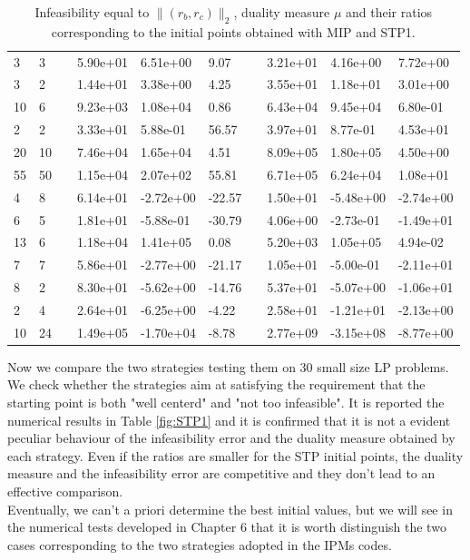 \documentclass[a4paper,10 pt,titlepage,twoside]{book}
\theoremstyle{plain}
\theoremstyle{definition}
\theoremstyle{remark}
\begin{document}
{{\begin{table}[!h]
\begin{tabular}{llllllllll}
		3 & 3 &  & 5.90e+01 & 6.51e+00 & 9.07 &  & 3.21e+01 & 4.16e+00 & 7.72e+00 \\
		3 & 2 &  & 1.44e+01 & 3.38e+00 & 4.25 &  & 3.55e+01 & 1.18e+01 & 3.01e+00 \\
		10 & 6 &  & 9.23e+03 & 1.08e+04 & 0.86 &  & 6.43e+04 & 9.45e+04 & 6.80e-01 \\
		2 & 2 &  & 3.33e+01 & 5.88e-01 & 56.57 &  & 3.97e+01 & 8.77e-01 & 4.53e+01 \\
		20 & 10 &  & 7.46e+04 & 1.65e+04 & 4.51 &  & 8.09e+05 & 1.80e+05 & 4.50e+00 \\
		55 & 50 &  & 1.15e+04 & 2.07e+02 & 55.81 &  & 6.71e+05 & 6.24e+04 & 1.08e+01 \\
		4 & 8 &  & 6.14e+01 & -2.72e+00 & -22.57 &  & 1.50e+01 & -5.48e+00 & -2.74e+00 \\
		6 & 5 &  & 1.81e+01 & -5.88e-01 & -30.79 &  & 4.06e+00 & -2.73e-01 & -1.49e+01 \\
		13 & 6 &  & 1.18e+04 & 1.41e+05 & 0.08 &  & 5.20e+03 & 1.05e+05 & 4.94e-02 \\
		7 & 7 &  & 5.86e+01 & -2.77e+00 & -21.17 &  & 1.05e+01 & -5.00e-01 & -2.11e+01 \\
		8 & 2 &  & 8.30e+01 & -5.62e+00 & -14.76 &  & 5.37e+01 & -5.07e+00 & -1.06e+01 \\
		2 & 4 &  & 2.64e+01 & -6.25e+00 & -4.22 &  & 2.58e+01 & -1.21e+01 & -2.13e+00 \\
		10 & 24 &  & 1.49e+05 & -1.70e+04 & -8.78 &  & 2.77e+09 & -3.15e+08 & -8.77e+00 \\ \hline
	\end{tabular}\caption{Infeasibility equal to $\lVert (r_{b}, r_{c})\rVert_{2}$, duality measure ${\mu}$ and their ratios corresponding to the initial points obtained with MIP and STP1.}
\end{table}
Now we compare the two strategies testing them on 30 small size LP problems.\\ 
We check whether the strategies aim at satisfying the requirement that the starting point is both "well centerd" and "not too infeasible". It is reported the numerical results in Table \ref{fig:STP1} and it is confirmed that it is not a evident peculiar behaviour of the infeasibility error and the duality measure obtained by each strategy. Even if the ratios are smaller for the STP initial points, the duality measure and the infeasibility error are competitive and they don't lead to an effective comparison. \\Eventually, we can't a priori determine the best initial values, but we will see in the numerical tests developed in Chapter 6 that it is worth distinguish the two cases corresponding to the two strategies adopted in the IPMs codes. 
}}
\end{document}
